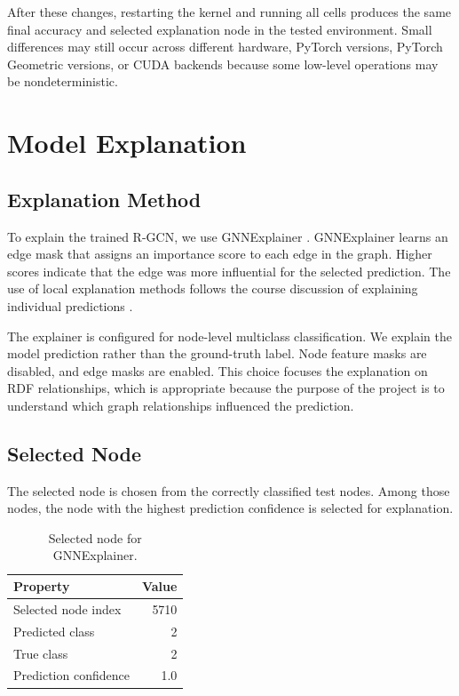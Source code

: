 \documentclass[runningheads]{llncs}
\begin{document}
After these changes, restarting the kernel and running all cells produces the same final accuracy and selected explanation node in the tested environment. Small differences may still occur across different hardware, PyTorch versions, PyTorch Geometric versions, or CUDA backends because some low-level operations may be nondeterministic.

\section{Model Explanation}

\subsection{Explanation Method}

To explain the trained R-GCN, we use GNNExplainer \cite{gnnexplainer,pygexplainerdocs}. GNNExplainer learns an edge mask that assigns an importance score to each edge in the graph. Higher scores indicate that the edge was more influential for the selected prediction. The use of local explanation methods follows the course discussion of explaining individual predictions \cite{lecture-local,lecture-neural}.

The explainer is configured for node-level multiclass classification. We explain the model prediction rather than the ground-truth label. Node feature masks are disabled, and edge masks are enabled. This choice focuses the explanation on RDF relationships, which is appropriate because the purpose of the project is to understand which graph relationships influenced the prediction.

\subsection{Selected Node}

The selected node is chosen from the correctly classified test nodes. Among those nodes, the node with the highest prediction confidence is selected for explanation.

\begin{table}
\centering
\caption{Selected node for GNNExplainer.}
\begin{tabular}{|l|r|}
\hline
Property & Value \\
\hline
Selected node index & 5710 \\
\hline
Predicted class & 2 \\
\hline
True class & 2 \\
\hline
Prediction confidence & 1.0 \\
\hline
\end{tabular}
\end{table}
\end{document}
